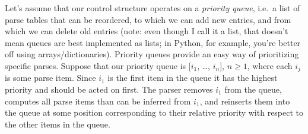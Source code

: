 Let's assume that our control structure operates on a \emph{priority queue}, i.e.\ a list of parse tables that can be reordered, to which we can add new entries, and from which we can delete old entries (note: even though I call it a list, that doesn't mean queues are best implemented as lists; in Python, for example, you're better off using arrays\slash dictionaries).
Priority queues provide an easy way of prioritizing specific parses.
Suppose that our priority queue is [$i_1$, \ldots, $i_n$], $n \geq 1$, where each $i_j$ is some parse item.
Since $i_1$ is the first item in the queue it has the highest priority and should be acted on first.
The parser removes $i_1$ from the queue, computes all parse items than can be inferred from $i_1$, and reinserts them into the queue at some position corresponding to their relative priority with respect to the other items in the queue.
%
